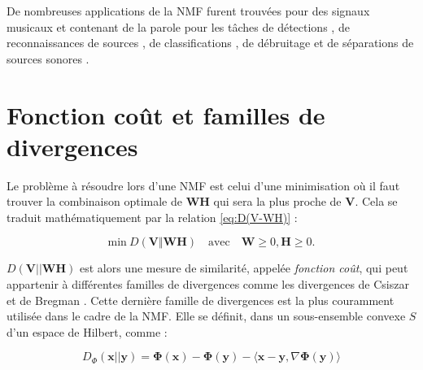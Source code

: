 De nombreuses applications de la NMF furent trouvées pour des signaux musicaux et contenant de la parole pour les tâches de détections \cite{dessein2013real}, de reconnaissances de sources \cite{gemmeke2013exemplar}, de classifications \cite{benetos2006musical}, de débruitage \cite{wilson_speech_2008} et de séparations de sources sonores \cite{virtanen_monaural_2007}.

%

\section{Fonction coût et familles de divergences}

Le problème à résoudre lors d'une NMF est celui d'une minimisation où il faut trouver la combinaison optimale de $\mathbf{WH}$ qui sera la plus proche de $\mathbf{V}$. Cela se traduit mathématiquement par la relation \ref{eq:D(V-WH)} :

\begin{equation}\label{eq:D(V-WH)}
\text{min}~D\left(\textbf{V} \Vert \textbf{WH}\right) \quad \text{avec} \quad \mathbf{W} \geq 0, \mathbf{H} \geq 0.
\end{equation}

$D\left(\textbf{V} \vert\vert \textbf{WH}\right)$ est alors une mesure de similarité, appelée \textit{fonction coût}, qui peut appartenir à différentes familles de divergences comme les divergences de Csiszar \cite{cichocki2006csiszar} et de Bregman \cite{bregman_relaxation_1967, dhillon_generalized_2005}. Cette dernière famille de divergences est la plus couramment utilisée dans le cadre de la NMF. Elle se définit, dans un sous-ensemble convexe $S$ d'un espace de Hilbert, comme :

\begin{equation}\label{eq:Bregdiv}
D_{\Phi}(\textbf{x}\vert\vert \textbf{y}) =
\mathbf{\Phi}(\mathbf{x}) - \mathbf{\Phi}(\mathbf{y}) -
\langle\mathbf{x}-\mathbf{y},\nabla\mathbf{\Phi}(\mathbf{y})\rangle
\end{equation}


